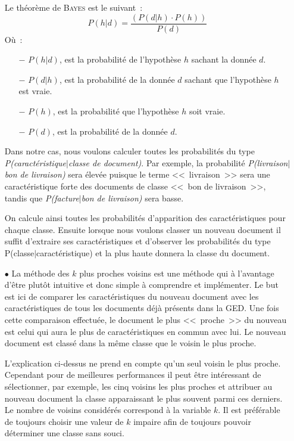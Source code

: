 \begin{itemize}
    Le théorème de \textsc{Bayes} est le suivant~:~
    $$P(h|d) = \frac{(P(d|h) \cdot P(h))}{P(d)}$$
    Où~:~
    \begin{itemize}
        \item[\tiny$-$] $P(h|d)$, est la probabilité de l'hypothèse $h$ sachant la donnée $d$.
        \item[\tiny$-$] $P(d|h)$, est la probabilité de la donnée $d$ sachant que l'hypothèse $h$ est vraie.
        \item[\tiny$-$] $P(h)$, est la probabilité que l'hypothèse $h$ soit vraie.
        \item[\tiny$-$] $P(d)$, est la probabilité de la donnée $d$.
    \end{itemize}
    Dans notre cas, nous voulons calculer toutes les probabilités du type \textit{P(caractéristique$|$classe de document)}.
    Par exemple, la probabilité \textit{P(livraison$|$bon de livraison)} sera élevée puisque le terme <<~livraison~>> sera une caractéristique forte des documents de classe <<~bon de livraison~>>, tandis que \textit{P(facture$|$bon de livraison)} sera basse.
    
    On calcule ainsi toutes les probabilités d'apparition des caractéristiques pour chaque classe.
    Ensuite lorsque nous voulons classer un nouveau document il suffit d'extraire ses caractéristiques et d'observer les probabilités du type P(classe$|$caractéristique) et la plus haute donnera la classe du document.
    ~\\
    
    \item[\tiny$\bullet$] La méthode des $k$ plus proches voisins est une méthode qui à l'avantage d'être plutôt intuitive et donc simple à comprendre et implémenter.
    Le but est ici de comparer les caractéristiques du nouveau document avec les caractéristiques de tous les documents déjà présents dans la GED.
    Une fois cette comparaison effectuée, le document le plus <<~proche~>> du nouveau est celui qui aura le plus de caractéristiques en commun avec lui.
    Le nouveau document est classé dans la même classe que le voisin le plus proche.
    
    L'explication ci-dessus ne prend en compte qu'un seul voisin le plus proche.
    Cependant pour de meilleures performances il peut être intéressant de sélectionner, par exemple, les cinq voisins les plus proches et attribuer au nouveau document la classe apparaissant le plus souvent parmi ces derniers.
    Le nombre de voisins considérés correspond à la variable $k$.
    Il est préférable de toujours choisir une valeur de $k$ impaire afin de toujours pouvoir déterminer une classe sans souci.
    

\end{itemize}
